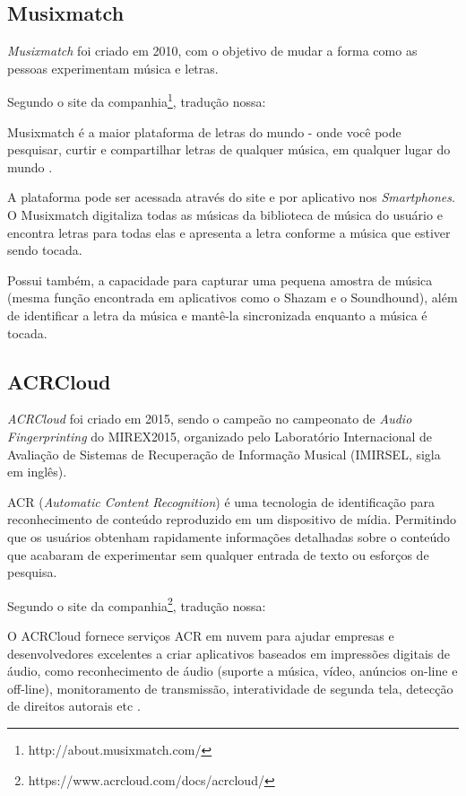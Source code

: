 \subsection{Musixmatch}
\textit{Musixmatch} foi criado em 2010, com o objetivo de mudar a forma como as pessoas experimentam música e letras.

Segundo o site da companhia\footnote{http://about.musixmatch.com/}, tradução nossa:

\begin{citacao}
Musixmatch é a maior plataforma de letras do mundo - onde você pode pesquisar, curtir e compartilhar letras de qualquer música, em qualquer lugar do mundo \cite{musixmatch2010}.
\end{citacao}

A plataforma pode ser acessada através do site e por aplicativo nos \textit{Smartphones}. O Musixmatch digitaliza todas as músicas da biblioteca de música do usuário e encontra letras para todas elas e apresenta a letra conforme a música que estiver sendo tocada. 

Possui também, a capacidade para capturar uma pequena amostra de música (mesma função encontrada em aplicativos como o Shazam e o Soundhound), além de identificar a letra da música e mantê-la sincronizada enquanto a música é tocada.

\subsection{ACRCloud}
\textit{ACRCloud} foi criado em 2015, sendo o campeão no campeonato de \textit{Audio Fingerprinting} do MIREX2015, organizado pelo Laboratório Internacional de Avaliação de Sistemas de Recuperação de Informação Musical (IMIRSEL, sigla em inglês).

ACR (\textit{Automatic Content Recognition}) é uma tecnologia de identificação para reconhecimento de conteúdo reproduzido em um dispositivo de mídia. Permitindo que os usuários obtenham rapidamente informações detalhadas sobre o conteúdo que acabaram de experimentar sem qualquer entrada de texto ou esforços de pesquisa.

Segundo o site da companhia\footnote{https://www.acrcloud.com/docs/acrcloud/}, tradução nossa:

\begin{citacao}
O ACRCloud fornece serviços ACR em nuvem para ajudar empresas e desenvolvedores excelentes a criar aplicativos baseados em impressões digitais de áudio, como reconhecimento de áudio (suporte a música, vídeo, anúncios on-line e off-line), monitoramento de transmissão, interatividade de segunda tela, detecção de direitos autorais etc \cite{acrcloud2015}.
\end{citacao}

